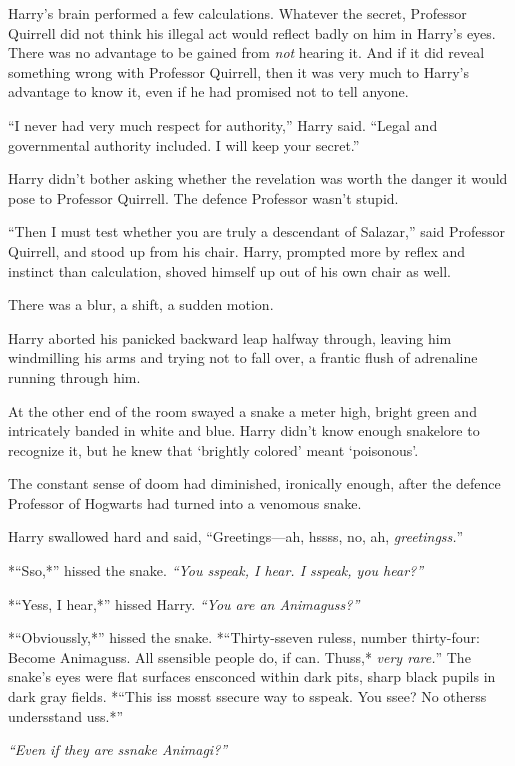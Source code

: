 Harry's brain performed a few calculations. Whatever the secret,
Professor Quirrell did not think his illegal act would reflect badly on
him in Harry's eyes. There was no advantage to be gained from \emph{not}
hearing it. And if it did reveal something wrong with Professor
Quirrell, then it was very much to Harry's advantage to know it, even if
he had promised not to tell anyone.

``I never had very much respect for authority,'' Harry said. ``Legal and
governmental authority included. I will keep your secret.''

Harry didn't bother asking whether the revelation was worth the danger
it would pose to Professor Quirrell. The defence Professor wasn't
stupid.

``Then I must test whether you are truly a descendant of Salazar,'' said
Professor Quirrell, and stood up from his chair. Harry, prompted more by
reflex and instinct than calculation, shoved himself up out of his own
chair as well.

There was a blur, a shift, a sudden motion.

Harry aborted his panicked backward leap halfway through, leaving him
windmilling his arms and trying not to fall over, a frantic flush of
adrenaline running through him.

At the other end of the room swayed a snake a meter high, bright green
and intricately banded in white and blue. Harry didn't know enough
snakelore to recognize it, but he knew that `brightly colored' meant
`poisonous'.

The constant sense of doom had diminished, ironically enough, after the
defence Professor of Hogwarts had turned into a venomous snake.

Harry swallowed hard and said, ``Greetings---ah, hssss, no, ah,
\emph{greetingss.}''

*``Sso,*'' hissed the snake. \emph{``You sspeak, I hear. I sspeak, you
hear?''}

*``Yess, I hear,*'' hissed Harry. \emph{``You are an Animaguss?''}

*``Obvioussly,*'' hissed the snake. *``Thirty-sseven ruless, number
thirty-four: Become Animaguss. All ssensible people do, if can. Thuss,*
\emph{very rare.}'' The snake's eyes were flat surfaces ensconced within
dark pits, sharp black pupils in dark gray fields. *``This iss mosst
ssecure way to sspeak. You ssee? No otherss undersstand uss.*''

\emph{``Even if they are ssnake Animagi?''}

